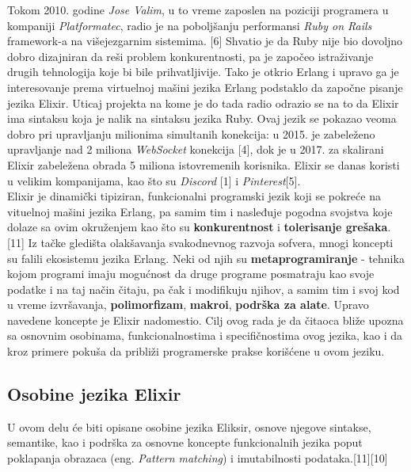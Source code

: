 \documentclass[12pt,oneside]{memoir}
\begin{document}
Tokom 2010. godine \textit{Jose Valim}, u to vreme zaposlen na poziciji programera u kompaniji \textit{Platformatec}, radio je na poboljšanju performansi
\textit{Ruby on Rails} framework-a na višejezgarnim sistemima. [6] Shvatio je da Ruby nije bio dovoljno dobro dizajniran da reši problem konkurentnosti, pa je započeo istraživanje drugih tehnologija koje bi bile prihvatljivije. Tako je otkrio Erlang i upravo ga je interesovanje prema virtuelnoj mašini jezika Erlang podstaklo da započne pisanje jezika Elixir. Uticaj projekta na kome je do tada radio odrazio se na to da Elixir ima sintaksu koja je nalik na sintaksu jezika Ruby. Ovaj jezik se pokazao veoma dobro pri upravljanju
milionima simultanih konekcija: u 2015. je zabeleženo upravljanje nad 2 miliona \textit{WebSocket} konekcija [4], dok je u 2017. za skalirani Elixir zabeležena obrada 5 miliona istovremenih korisnika. Elixir se danas koristi u velikim kompanijama, kao što su \textit{Discord} [1] i \textit{Pinterest}[5].\\

Elixir je dinamički tipiziran, funkcionalni programski jezik koji se pokreće na vituelnoj mašini jezika Erlang, pa samim tim i nasleđuje pogodna svojstva koje dolaze sa ovim okruženjem kao što su \textbf{konkurentnost} i \textbf{tolerisanje grešaka}.[11] Iz tačke gledišta olakšavanja svakodnevnog razvoja sofvera, mnogi koncepti su falili ekosistemu jezika Erlang. Neki od njih su \textbf{metaprogramiranje} - tehnika kojom programi imaju mogućnost da druge programe posmatraju kao svoje podatke i na taj način čitaju, pa
čak i modifikuju njihov, a samim tim i svoj kod u vreme izvršavanja, \textbf{polimorfizam}, \textbf{makroi}, \textbf{podrška za alate}. Upravo navedene koncepte je  Elixir nadomestio. Cilj ovog rada je da čitaoca bliže upozna sa osnovnim osobinama, funkcionalnostima i specifičnostima ovog jezika,  kao i da kroz primere pokuša da približi programerske prakse korišćene u ovom jeziku.\\

\subsection{Osobine jezika Elixir}

U ovom delu će biti opisane osobine jezika Eliksir, osnove njegove sintakse, semantike, kao i podrška za osnovne koncepte funkcionalnih jezika poput poklapanja obrazaca (eng. \textit{Pattern matching}) i imutabilnosti podataka.[11][10]\\
\end{document}
